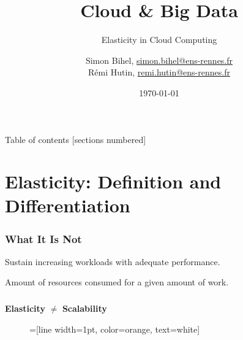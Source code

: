 \documentclass{beamer}
\title{Cloud \& Big Data}
\subtitle{Elasticity in Cloud Computing}
\date{\today}
\author{%
  Simon Bihel, \url{simon.bihel@ens-rennes.fr} \\
  Rémi Hutin, \url{remi.hutin@ens-rennes.fr}
}
\institute{%
  University of Rennes I \\
  École normale supérieure de Rennes
}
\begin{document}
\maketitle

\begin{frame}{Table of contents}
  [sections numbered]
  \tableofcontents[hideallsubsections]
\end{frame}


\section{Elasticity: Definition and Differentiation}
\begin{frame}
  \frametitle{What It Is Not~\cite{herbst2013elasticity}}
  \begin{description}
    \parbox{\linewidth}{%
    \item[Scalability] Sustain increasing workloads with adequate performance.
    \item[Efficiency] Amount of resources consumed for a given amount of work.
    }
  \end{description}
\end{frame}

\begin{frame}
  \frametitle{}
  \centering
  \Large\textbf{Elasticity} $\neq$ \textbf{Scalability}

\end{frame}

\begin{frame}
\begin{figure}
=[line width=1pt, color=orange, text=white]
\def\firstcircle{(-2.85,0) circle (1.5cm)}
\def\secondcircle{(0,2.85) circle (1.5cm)}
\def\thirdcircle{(2.85,0) circle (1.5cm)}
\end{figure}
\end{frame}
\end{document}
